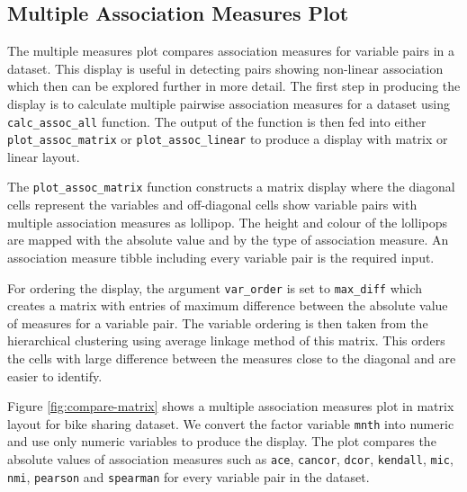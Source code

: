 \begin{Schunk}
\begin{figure}
boxplot for mixed pair (workingday,casual) and barplot for ordinal pair ((workingday, holiday) showing association between the pairs of variables.}\label{fig:int-pairs-bike}
\end{figure}
\end{Schunk}

\hypertarget{multiple-association-measures-plot}{%
\subsection{Multiple Association Measures
Plot}\label{multiple-association-measures-plot}}

The multiple measures plot compares association measures for variable
pairs in a dataset. This display is useful in detecting pairs showing
non-linear association which then can be explored further in more
detail. The first step in producing the display is to calculate multiple
pairwise association measures for a dataset using
\texttt{calc\_assoc\_all} function. The output of the function is then
fed into either \texttt{plot\_assoc\_matrix} or
\texttt{plot\_assoc\_linear} to produce a display with matrix or linear
layout.

The \texttt{plot\_assoc\_matrix} function constructs a matrix display
where the diagonal cells represent the variables and off-diagonal cells
show variable pairs with multiple association measures as lollipop. The
height and colour of the lollipops are mapped with the absolute value
and by the type of association measure. An association measure tibble
including every variable pair is the required input.

For ordering the display, the argument \texttt{var\_order} is set to
\texttt{max\_diff} which creates a matrix with entries of maximum
difference between the absolute value of measures for a variable pair.
The variable ordering is then taken from the hierarchical clustering
using average linkage method of this matrix. This orders the cells with
large difference between the measures close to the diagonal and are
easier to identify.

Figure \ref{fig:compare-matrix} shows a multiple association measures
plot in matrix layout for bike sharing dataset. We convert the factor
variable \texttt{mnth} into numeric and use only numeric variables to
produce the display. The plot compares the absolute values of
association measures such as \texttt{ace}, \texttt{cancor},
\texttt{dcor}, \texttt{kendall}, \texttt{mic}, \texttt{nmi},
\texttt{pearson} and \texttt{spearman} for every variable pair in the
dataset.

